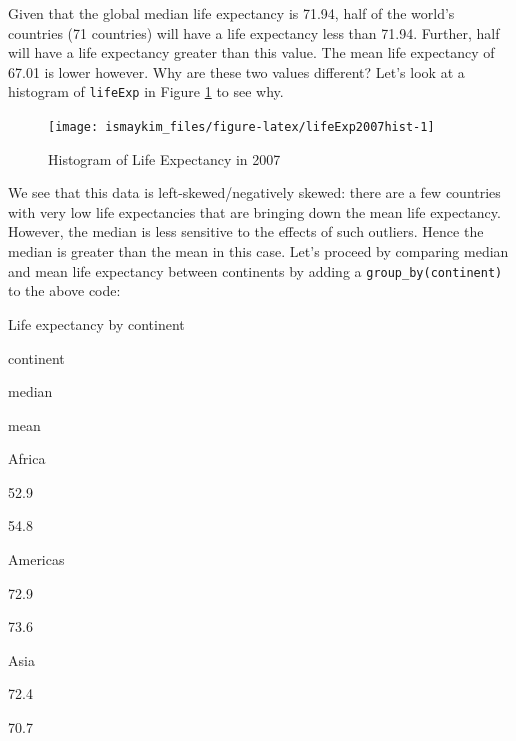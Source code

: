 \documentclass[12pt,]{krantz}
\makeatletter
\newenvironment{Shaded}{\begin{snugshade}}{\end{snugshade}}
\newcommand{\KeywordTok}[1]{\textcolor[rgb]{0.27,0.27,0.27}{\textbf{#1}}}
\newcommand{\DataTypeTok}[1]{\textcolor[rgb]{0.27,0.27,0.27}{#1}}
\newcommand{\StringTok}[1]{\textcolor[rgb]{0.5,0.5,0.5}{#1}}
\newcommand{\OperatorTok}[1]{\textcolor[rgb]{0.43,0.43,0.43}{\textbf{#1}}}
\newcommand{\NormalTok}[1]{#1}
\newenvironment{kframe}{%
\medskip{}
\setlength{\fboxsep}{.8em}
 \def\at@end@of@kframe{}%
 \ifinner\ifhmode%
  \def\at@end@of@kframe{\end{minipage}}%
  \begin{minipage}{\columnwidth}%
 \fi\fi%
 \def\FrameCommand##1{\hskip\@totalleftmargin \hskip-\fboxsep
 \colorbox{shadecolor}{##1}\hskip-\fboxsep
     \hskip-\linewidth \hskip-\@totalleftmargin \hskip\columnwidth}%
 \MakeFramed {\advance\hsize-\width
   \@totalleftmargin\z@ \linewidth\hsize
   \@setminipage}}%
 {\par\unskip\endMakeFramed%
 \at@end@of@kframe}
\renewenvironment{Shaded}{\begin{kframe}}{\end{kframe}}
\makeatother
\begin{document}
Given that the global median life expectancy is 71.94, half of the
world's countries (71 countries) will have a life expectancy less than
71.94. Further, half will have a life expectancy greater than this
value. The mean life expectancy of 67.01 is lower however. Why are these
two values different? Let's look at a histogram of \texttt{lifeExp} in
Figure \ref{fig:lifeExp2007hist} to see why.

\begin{figure}

{\centering \texttt{[image: ismaykim\_files/figure-latex/lifeExp2007hist-1]} 

}

\caption{Histogram of Life Expectancy in 2007}\label{fig:lifeExp2007hist}
\end{figure}

We see that this data is left-skewed/negatively skewed: there are a few
countries with very low life expectancies that are bringing down the
mean life expectancy. However, the median is less sensitive to the
effects of such outliers. Hence the median is greater than the mean in
this case. Let's proceed by comparing median and mean life expectancy
between continents by adding a \texttt{group\_by(continent)} to the
above code:

\begin{Shaded}
\end{Shaded}

\label{tab:catxplot0}Life expectancy by continent

continent

median

mean

Africa

52.9

54.8

Americas

72.9

73.6

Asia

72.4

70.7
\end{document}
